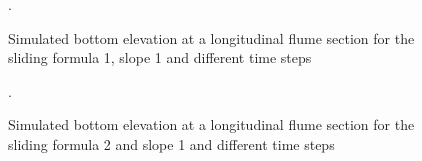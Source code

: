 \begin{figure} [!h]
\centering
{}
 \caption{Simulated bottom elevation at a longitudinal flume section for the
 sliding formula 1, slope 1 and different time steps}.\label{slide:results3}
\end{figure}

\begin{figure} [!h]
\centering
{}
 \caption{Simulated bottom elevation at a longitudinal flume section for the
sliding formula 2 and slope 1 and different time steps}.\label{slide:results4}
\end{figure}

